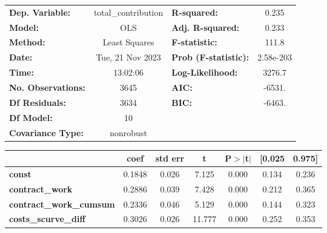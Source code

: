 \begin{center}
\begin{tabular}{lclc}
\toprule
\textbf{Dep. Variable:}                   & total\_contribution & \textbf{  R-squared:         } &     0.235   \\
\textbf{Model:}                           &         OLS         & \textbf{  Adj. R-squared:    } &     0.233   \\
\textbf{Method:}                          &    Least Squares    & \textbf{  F-statistic:       } &     111.8   \\
\textbf{Date:}                            &   Tue, 21 Nov 2023  & \textbf{  Prob (F-statistic):} & 2.58e-203   \\
\textbf{Time:}                            &       13:02:06      & \textbf{  Log-Likelihood:    } &    3276.7   \\
\textbf{No. Observations:}                &          3645       & \textbf{  AIC:               } &    -6531.   \\
\textbf{Df Residuals:}                    &          3634       & \textbf{  BIC:               } &    -6463.   \\
\textbf{Df Model:}                        &            10       & \textbf{                     } &             \\
\textbf{Covariance Type:}                 &      nonrobust      & \textbf{                     } &             \\
\bottomrule
\end{tabular}
\begin{tabular}{lcccccc}
                                          & \textbf{coef} & \textbf{std err} & \textbf{t} & \textbf{P$> |$t$|$} & \textbf{[0.025} & \textbf{0.975]}  \\
\midrule
\textbf{const}                            &       0.1848  &        0.026     &     7.125  &         0.000        &        0.134    &        0.236     \\
\textbf{contract\_work}                   &       0.2886  &        0.039     &     7.428  &         0.000        &        0.212    &        0.365     \\
\textbf{contract\_work\_cumsum}           &       0.2336  &        0.046     &     5.129  &         0.000        &        0.144    &        0.323     \\
\textbf{costs\_scurve\_diff}              &       0.3026  &        0.026     &    11.777  &         0.000        &        0.252    &        0.353     \\

\end{tabular}
\end{center}
